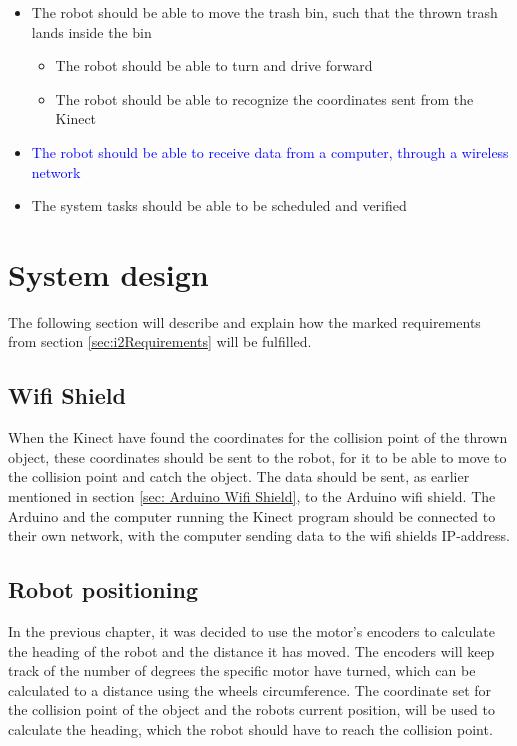 \begin{itemize}
\begin{itemize}
	\end{itemize}
	\item The robot should be able to move the trash bin, such that the thrown trash lands inside the bin
	\begin{itemize}
		\item {The robot should be able to turn and drive forward}
		\item {The robot should be able to recognize the coordinates sent from the Kinect}
	\end{itemize}
	\item \textcolor{blue}{The robot should be able to receive data from a computer, through a wireless network}
	\item {The system tasks should be able to be scheduled and verified}
\end{itemize}

\section{System design}
\label{sec:i2System design} 
The following section will describe and explain how the marked requirements from section \ref{sec:i2Requirements} will be fulfilled. 

\subsection{Wifi Shield}
\label{sec:Wifi Shield SD}
When the Kinect have found the coordinates for the collision point of the thrown object, these coordinates should be sent to the robot, for it to be able to move to the collision point and catch the object. 
The data should be sent, as earlier mentioned in section \ref{sec: Arduino Wifi Shield}, to the Arduino wifi shield. The Arduino and the computer running the Kinect program should be connected to their own network, with the computer sending data to the wifi shields IP-address.

\subsection{Robot positioning}
\label{sec:Robot positioning System Design}
In the previous chapter, it was decided to use the motor's encoders to calculate the heading of the robot and the distance it has moved. The encoders will keep track of the number of degrees the specific motor have turned, which can be calculated to a distance using the wheels circumference.
The coordinate set for the collision point of the object and the robots current position, will be used to calculate the heading, which the robot should have to reach the collision point. 

